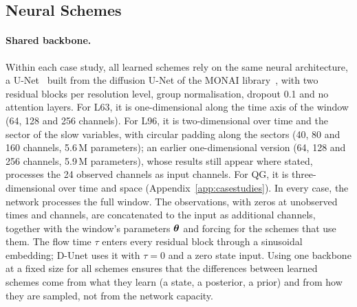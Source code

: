 \subsection{Neural Schemes}\label{sec:neural}

\paragraph{Shared backbone.}
Within each case study, all learned schemes rely on the same neural architecture, a
U-Net~\cite{ronneberger_u-net_2015} built from the diffusion U-Net of the MONAI
library~\cite{cardoso_monai_2022}, with two residual blocks per resolution level, group
normalisation, dropout 0.1 and no attention layers. For L63, it is one-dimensional along the
time axis of the window (64, 128 and 256 channels). For L96, it is two-dimensional over time
and the sector of the slow variables, with circular padding along the sectors (40, 80 and 160
channels, 5.6\,M parameters); an earlier one-dimensional version (64, 128 and 256 channels,
5.9\,M parameters), whose results still appear where stated, processes the 24 observed
channels as input channels. For QG, it is three-dimensional over time and space
(Appendix~\ref{app:casestudies}). In every case, the network processes the full window. The observations, with zeros at unobserved times and channels, are
concatenated to the input as additional channels, together with the
window's parameters $\boldsymbol{\theta}$ and forcing for the schemes that use them. The
flow time $\tau$ enters every residual block through a sinusoidal embedding;
D-Unet uses it with $\tau = 0$ and a zero state input.
Using one backbone at a fixed size for all schemes ensures that the differences
between learned schemes come from what they learn (a state, a posterior, a prior)
and from how they are sampled, not from the network capacity.


